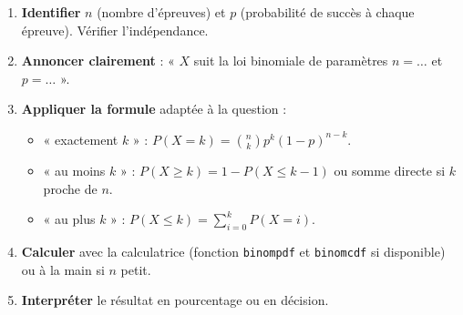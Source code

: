 \documentclass[11pt]{article}
\begin{document}
\begin{methode}
\begin{enumerate}
\item \textbf{Identifier} $n$ (nombre d'épreuves) et $p$ (probabilité de succès à chaque épreuve). Vérifier l'indépendance.
\item \textbf{Annoncer clairement} : « $X$ suit la loi binomiale de paramètres $n = \ldots$ et $p = \ldots$ ».
\item \textbf{Appliquer la formule} adaptée à la question :
\begin{itemize}
\item « exactement $k$ » : $P(X=k) = \binom{n}{k} p^k (1-p)^{n-k}$.
\item « au moins $k$ » : $P(X \geq k) = 1 - P(X \leq k-1)$ ou somme directe si $k$ proche de $n$.
\item « au plus $k$ » : $P(X \leq k) = \sum_{i=0}^k P(X=i)$.
\end{itemize}
\item \textbf{Calculer} avec la calculatrice (fonction \texttt{binompdf} et \texttt{binomcdf} si disponible) ou à la main si $n$ petit.
\item \textbf{Interpréter} le résultat en pourcentage ou en décision.
\end{enumerate}
\end{methode}
\end{document}
